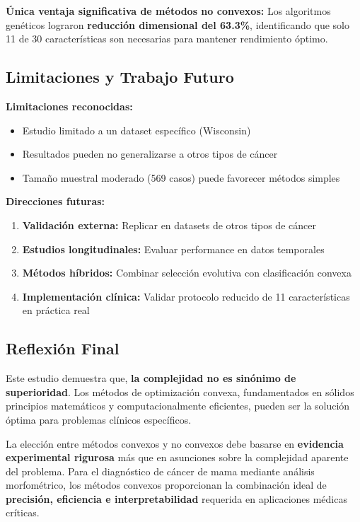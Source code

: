 \documentclass[12pt,a4paper]{article}
\begin{document}
\textbf{Única ventaja significativa de métodos no convexos:} Los algoritmos genéticos lograron \textbf{reducción dimensional del 63.3\%}, identificando que solo 11 de 30 características son necesarias para mantener rendimiento óptimo.

\subsection{Limitaciones y Trabajo Futuro}

\textbf{Limitaciones reconocidas:}
\begin{itemize}
    \item Estudio limitado a un dataset específico (Wisconsin)
    \item Resultados pueden no generalizarse a otros tipos de cáncer
    \item Tamaño muestral moderado (569 casos) puede favorecer métodos simples
\end{itemize}

\textbf{Direcciones futuras:}
\begin{enumerate}
    \item \textbf{Validación externa:} Replicar en datasets de otros tipos de cáncer
    \item \textbf{Estudios longitudinales:} Evaluar performance en datos temporales
    \item \textbf{Métodos híbridos:} Combinar selección evolutiva con clasificación convexa
    \item \textbf{Implementación clínica:} Validar protocolo reducido de 11 características en práctica real
\end{enumerate}

\subsection{Reflexión Final}

Este estudio demuestra que, \textbf{la complejidad no es sinónimo de superioridad}. Los métodos de optimización convexa, fundamentados en sólidos principios matemáticos y computacionalmente eficientes, pueden ser la solución óptima para problemas clínicos específicos.

La elección entre métodos convexos y no convexos debe basarse en \textbf{evidencia experimental rigurosa} más que en asunciones sobre la complejidad aparente del problema. Para el diagnóstico de cáncer de mama mediante análisis morfométrico, los métodos convexos proporcionan la combinación ideal de \textbf{precisión, eficiencia e interpretabilidad} requerida en aplicaciones médicas críticas.
\end{document}
